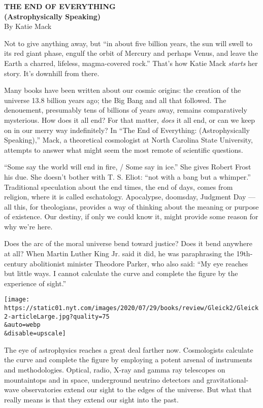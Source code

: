 \textbf{THE END OF EVERYTHING}\\
\textbf{(Astrophysically Speaking)}\\
By Katie Mack

Not to give anything away, but ``in about five billion years, the sun
will swell to its red giant phase, engulf the orbit of Mercury and
perhaps Venus, and leave the Earth a charred, lifeless, magma-covered
rock.'' That's how Katie Mack \emph{starts} her story. It's downhill
from there.

Many books have been written about our cosmic origins: the creation of
the universe 13.8 billion years ago; the Big Bang and all that followed.
The denouement, presumably tens of billions of years away, remains
comparatively mysterious. How does it all end? For that matter,
\emph{does} it all end, or can we keep on in our merry way indefinitely?
In ``The End of Everything: (Astrophysically Speaking),'' Mack, a
theoretical cosmologist at North Carolina State University, attempts to
answer what might seem the most remote of scientific questions.

``Some say the world will end in fire, / Some say in ice.'' She gives
Robert Frost his due. She doesn't bother with T. S. Eliot: ``not with a
bang but a whimper.'' Traditional speculation about the end times, the
end of days, comes from religion, where it is called eschatology.
Apocalypse, doomsday, Judgment Day --- all this, for theologians,
provides a way of thinking about the meaning or purpose of existence.
Our destiny, if only we could know it, might provide some reason for why
we're here.

Does the arc of the moral universe bend toward justice? Does it bend
anywhere at all? When Martin Luther King Jr. said it did, he was
paraphrasing the 19th-century abolitionist minister Theodore Parker, who
also said: ``My eye reaches but little ways. I cannot calculate the
curve and complete the figure by the experience of sight.''

\texttt{[image: https://static01.nyt.com/images/2020/07/29/books/review/Gleick2/Gleick2-articleLarge.jpg?quality=75\\\&auto=webp\\\&disable=upscale]}

The eye of astrophysics reaches a great deal farther now. Cosmologists
calculate the curve and complete the figure by employing a potent
arsenal of instruments and methodologies. Optical, radio, X-ray and
gamma ray telescopes on mountaintops and in space, underground neutrino
detectors and gravitational-wave observatories extend our sight to the
edges of the universe. But what that really means is that they extend
our sight into the past.

